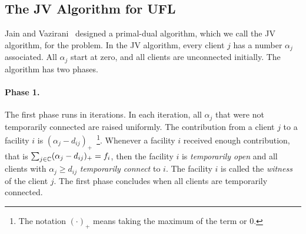 \documentclass[oneside,final]{ucr}
\begin{document}
\subsection{The JV Algorithm for UFL}
Jain and Vazirani~\cite{JainV01} designed a primal-dual
algorithm, which we call the JV algorithm, for the {\UFL}
problem. In the JV algorithm, every client $j$ has a number
$\alpha_j$ associated. All $\alpha_j$ start at zero, and all
clients are unconnected initially. The algorithm has two
phases. 

\paragraph{Phase 1.} The first phase runs in iterations. In
each iteration, all $\alpha_j$ that were not temporarily
connected are raised uniformly. The contribution from a
client $j$ to a facility $i$ is $(\alpha_j -
d_{ij})_+$~\footnote{The notation $(\cdot)_+$ means taking
  the maximum of the term or $0$.}. Whenever a facility $i$
received enough contribution, that is $\sum_{j\in\mathbb{C}}
(\alpha_j - d_{ij})_+ = f_i$, then the facility $i$ is
\emph{temporarily open} and all clients with $\alpha_j \geq
d_{ij}$ \emph{temporarily connect} to $i$. The facility $i$
is called the \emph{witness} of the client $j$. The first
phase concludes when all clients are temporarily connected.
\end{document}
